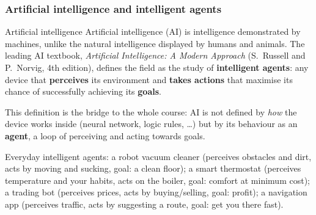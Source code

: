 \subsubsection{Artificial intelligence and intelligent agents}
\label{sec:ai-definition}

\begin{nbdef}{Artificial intelligence}
Artificial intelligence (AI) is intelligence demonstrated by machines, unlike the natural
intelligence displayed by humans and animals. The leading AI textbook, \emph{Artificial
Intelligence: A Modern Approach} (S.~Russell and P.~Norvig, 4th edition), defines the field
as the study of \textbf{intelligent agents}: any device that \textbf{perceives} its
environment and \textbf{takes actions} that maximise its chance of successfully achieving
its \textbf{goals}.
\end{nbdef}

This definition is the bridge to the whole course: AI is not defined by \emph{how} the
device works inside (neural network, logic rules, \ldots) but by its behaviour as an
\textbf{agent}, a loop of perceiving and acting towards goals.

\begin{center}
\end{center}

\begin{nbwhy}
Everyday intelligent agents: a robot vacuum cleaner (perceives obstacles and dirt, acts by
moving and sucking, goal: a clean floor); a smart thermostat (perceives temperature and your
habits, acts on the boiler, goal: comfort at minimum cost); a trading bot (perceives prices,
acts by buying/selling, goal: profit); a navigation app (perceives traffic, acts by
suggesting a route, goal: get you there fast).
\end{nbwhy}
